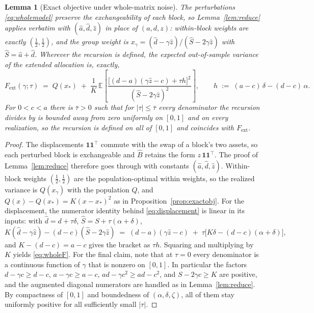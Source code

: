 \documentclass[11pt]{article}
\newtheorem{lemma}{Lemma}
\theoremstyle{remark}
\newcommand{\E}{\mathbb{E}}
\begin{document}
\begin{lemma}[Exact objective under whole-matrix noise]
\label{lem:wholeobj}
The perturbations \eqref{eq:wholemodel} preserve the exchangeability of
each block, so Lemma~\ref{lem:reduce} applies verbatim with
$(\hat a, \hat d, \hat z)$ in place of $(a, d, z)$: within-block weights
are exactly $(\tfrac12, \tfrac12)$, and the group weight is
$x_\gamma = (\hat d - \gamma\hat z)/(\hat S - 2\gamma\hat z)$ with
$\hat S = \hat a + \hat d$. Wherever the recursion is defined, the
expected out-of-sample variance of the extended allocation is, exactly,
\begin{equation}
  F_{\mathrm{ext}}(\gamma;\tau)
  \;=\; Q(x_*) \;+\; \frac{1}{K}\,
  \E\!\left[
    \frac{\big[(d-a)(\gamma\hat z - c) + \tau h\big]^2}
         {(\hat S - 2\gamma\hat z)^2}
  \right],
  \qquad
  h \;:=\; (a-c)\,\delta - (d-c)\,\alpha.
  \label{eq:wholeF}
\end{equation}
For $0 < c < a$ there is $\bar\tau > 0$ such that for
$|\tau| \le \bar\tau$ every denominator the recursion divides by is
bounded away from zero uniformly on $[0,1]$ and on every realization, so
the recursion is defined on all of $[0,1]$ and coincides with
$F_{\mathrm{ext}}$.
\end{lemma}
\begin{proof}
The displacements $\mathbf{1}\mathbf{1}^\top$ commute with the swap of a
block's two assets, so each perturbed block is exchangeable and
$\widehat B$ retains the form $z\,\mathbf{1}\mathbf{1}^\top$. The proof of
Lemma~\ref{lem:reduce} therefore goes through with constants
$(\hat a, \hat d, \hat z)$. Within-block weights $(\tfrac12,\tfrac12)$ are
the population-optimal within weights, so the realized variance is
$Q(x_\gamma)$ with the population $Q$, and
$Q(x) - Q(x_*) = K(x - x_*)^2$ as in
Proposition~\ref{prop:exactobj}. For the displacement, the numerator
identity behind \eqref{eq:displacement} is linear in its inputs: with
$\hat d = d + \tau\delta$, $\hat S = S + \tau(\alpha + \delta)$,
\[
  K(\hat d - \gamma\hat z) - (d - c)(\hat S - 2\gamma\hat z)
  \;=\; (d-a)(\gamma\hat z - c)
  \;+\; \tau\big[K\delta - (d-c)(\alpha+\delta)\big],
\]
and $K - (d-c) = a - c$ gives the bracket as $\tau h$. Squaring and
multiplying by $K$ yields \eqref{eq:wholeF}. For the final claim, note
that at $\tau = 0$ every denominator is a continuous function of $\gamma$
that is nonzero on $[0,1]$. In particular the factors
$d - \gamma c \ge d - c$, $a - \gamma c \ge a - c$,
$ad - \gamma c^2 \ge ad - c^2$, and $S - 2\gamma c \ge K$ are positive,
and the augmented diagonal numerators are handled as in
Lemma~\ref{lem:reduce}. By compactness of $[0,1]$ and boundedness of
$(\alpha,\delta,\zeta)$, all of them stay uniformly positive for all
sufficiently small $|\tau|$.
\end{proof}
\end{document}

